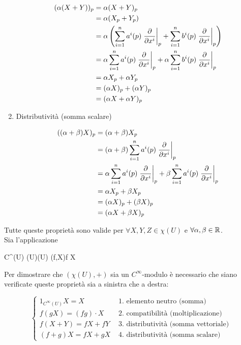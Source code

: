 \begin{enumerate}
	\begin{align}
		\begin{split}
			(\alpha (X + Y))_{p} &= \alpha (X + Y)_{p}\\
			&= \alpha (X_{p} + Y_{p})\\
			&= \alpha \left( \sum_{i=1}^{n} a^{i} (p) \eval{ \pdv{x^{i}} }_{p} + \sum_{i=1}^{n} b^{i} (p) \eval{ \pdv{x^{i}} }_{p} \right)\\
			&= \alpha \sum_{i=1}^{n} a^{i} (p) \eval{ \pdv{x^{i}} }_{p} + \alpha \sum_{i=1}^{n} b^{i} (p) \eval{ \pdv{x^{i}} }_{p}\\
			&= \alpha X_{p} + \alpha Y_{p}\\
			&= (\alpha X)_{p} + (\alpha Y)_{p}\\
			&= (\alpha X + \alpha Y)_{p}
		\end{split}
	\end{align}
	
	\item Distributività (somma scalare)
	
	\begin{align}
		\begin{split}
			((\alpha + \beta) X)_{p} &= (\alpha + \beta) X_{p}\\
			&= (\alpha + \beta) \sum_{i=1}^{n} a^{i} (p) \eval{ \pdv{x^{i}} }_{p}\\
			&= \alpha \sum_{i=1}^{n} a^{i} (p) \eval{ \pdv{x^{i}} }_{p} + \beta \sum_{i=1}^{n} a^{i} (p) \eval{ \pdv{x^{i}} }_{p}\\
			&= \alpha X_{p} + \beta X_{p}\\
			&= (\alpha X)_{p} + (\beta X)_{p}\\
			&= (\alpha X + \beta X)_{p} 
		\end{split}
	\end{align}
\end{enumerate}

Tutte queste proprietà sono valide per $ \forall X, Y, Z \in \chi(U) $ e $ \forall \alpha, \beta \in \mathbb{R} $.\\
Sia l'applicazione

\map{\cdot}
	{C^{\infty}(U) \times \chi(U)}{\chi(U)}
	{(f,X)}{f X}

Per dimostrare che $ (\chi(U),+) $ sia un $ C^{\infty} $-modulo è necessario che siano verificate queste proprietà sia a sinistra che a destra:

\begin{equation}
	\begin{cases}
		1_{C^{\infty}(U)} X = X & \text{ 1. elemento neutro (somma) }\\
		f (g X) = (f g) \cdot X & \text{ 2. compatibilità (moltiplicazione) }\\
		f (X+Y) = f X + f Y & \text{ 3. distributività (somma vettoriale) }\\
		(f+g) X = f X + g X & \text{ 4. distributività (somma scalare) }
	\end{cases}
\end{equation}

